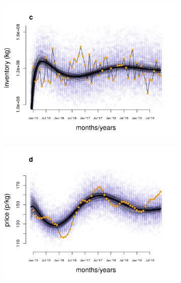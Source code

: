 \documentclass[9pt,twocolumn,twoside,lineno]{pnas-new}
\begin{document}
\begin{figure}[t!]
  \begin{subfigure}{0.5\textwidth}
   \centering
    \includegraphics[scale=0.4]{figure_3c.png}
  \end{subfigure}%
  \begin{subfigure}{0.5\textwidth}
   \centering
    \includegraphics[scale=0.4]{figure_3d.png}
  \end{subfigure}


\end{figure}
\end{document}
